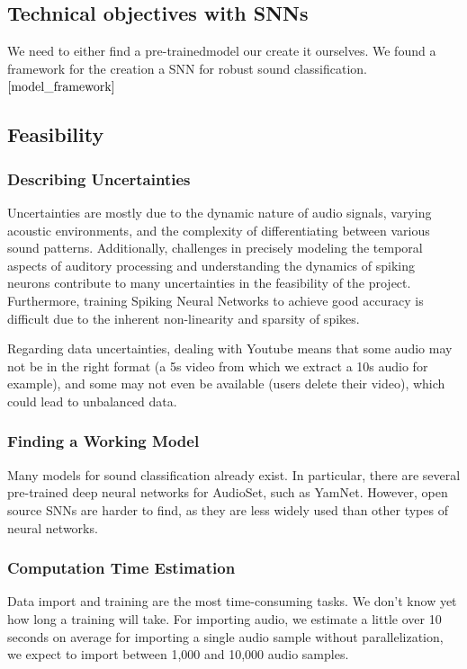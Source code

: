 \documentclass[11pt]{article}
\begin{document}
\subsection{Technical objectives with SNNs}

We need to either find a pre-trainedmodel our create it ourselves. We found a framework for the creation a SNN for robust sound classification.${\cite{model_framework}}$


\subsection{Feasibility}
\subsubsection{Describing Uncertainties}
Uncertainties are mostly due to the dynamic nature of audio signals, varying acoustic environments, and the complexity of differentiating between various sound patterns. Additionally, challenges in precisely modeling the temporal aspects of auditory processing and understanding the dynamics of spiking neurons contribute to many uncertainties in the feasibility of the project. Furthermore, training Spiking Neural Networks to achieve good accuracy is difficult due to the inherent non-linearity and sparsity of spikes.

Regarding data uncertainties, dealing with Youtube means that some audio may not be in the right format (a 5s video from which we extract a 10s audio for example), and some may not even be available (users delete their video), which could lead to unbalanced data.


\subsubsection{Finding a Working Model}

Many models for sound classification already exist. In particular, there are several pre-trained deep neural networks for AudioSet, such as YamNet. However, open source SNNs are harder to find, as they are less widely used than other types of neural networks.

\subsubsection{Computation Time Estimation}

Data import and training are the most time-consuming tasks. We don't know yet how long a training will take. For importing audio, we estimate a little over 10 seconds on average for importing a single audio sample without parallelization, we expect to import between 1,000 and 10,000 audio samples.
\end{document}
